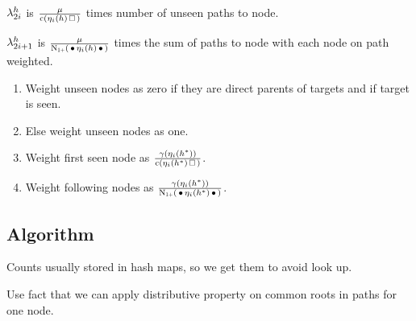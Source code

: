 
\begin{draft}
$\lambda_{2 i}^h$ is $\frac{\mu}{\Count(\History_i(h) \Skp)}$ times number
of unseen paths to node.

$\lambda_{2 i + 1}^h$ is
$\frac{\mu}{\ContCountIp(\WSkp \History_i(h) \WSkp)}$ times the sum of paths to
node with each node on path weighted.
\begin{enumerate}
  \item Weight unseen nodes as zero if they are direct parents of targets and if
    target is seen.
  \item Else weight unseen nodes as one.
  \item Weight first seen node as $\frac{\gamma(\History_i(h^*))}{\Count(\History_i(h^*) \Skp)}$.
  \item Weight following nodes as $\frac{\gamma(\History_i(h^*))}{\ContCountIp(\WSkp \History_i(h^*) \WSkp)}$.
\end{enumerate}
\end{draft}


\subsection{Algorithm}

\begin{draft}
Counts usually stored in hash maps, so we get them to avoid look up.

Use fact that we can apply distributive property on common roots in paths for
one node.
\end{draft}

